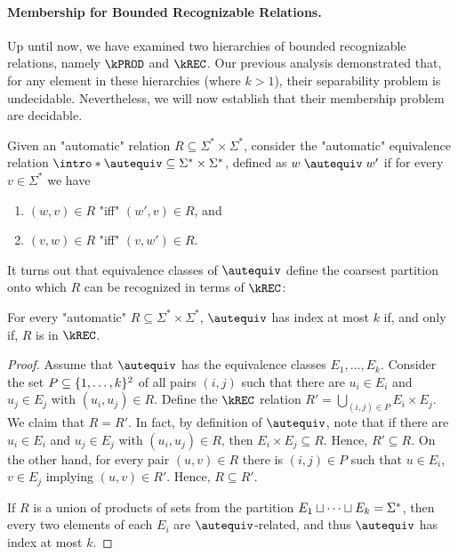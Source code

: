 \paragraph*{Membership for Bounded Recognizable Relations.}
Up until now, we have examined two hierarchies of bounded recognizable relations, namely $\kPROD$ and $\kREC$. 
Our previous analysis demonstrated that, for any element in these hierarchies (where $k>1$), their separability problem is undecidable. Nevertheless, 
we will now establish that their membership problem are decidable.

\AP Given an "automatic" relation $R \subseteq \Sigma^* \times \Sigma^*$, consider the "automatic" equivalence relation $\intro*\autequiv \subseteq \Sigma^* \times \Sigma^*$, defined as $w \mathrel{\autequiv} w'$ if for every $v \in \Sigma^*$ we have 
\begin{enumerate}
    \item $(w,v) \in R$ "iff" $(w',v) \in R$, and
    \item $(v,w) \in R$ "iff" $(v,w') \in R$.
\end{enumerate}

It turns out that equivalence classes of $\autequiv$ define the coarsest partition onto which $R$ can be recognized in terms of $\kREC$:

\begin{lemma}\AP\label{lem:krec-characterization}
    For every "automatic" $R \subseteq \Sigma^* \times \Sigma^*$, $\autequiv$ has index at most $k$ if, and only if, $R$ is in $\kREC$.
\end{lemma}
\begin{proof}
    Assume that $\autequiv$ has the equivalence classes $E_1, \dotsc, E_k$. Consider the set $P \subseteq \{1, \dotsc, k\}^2$ of all pairs $(i,j)$ such that there are $u_i \in E_i$ and $u_j \in E_j$ with $(u_i,u_j) \in R$. Define the $\kREC$ relation $R' = \bigcup_{(i,j) \in P} E_i \times E_j$. We claim that $R=R'$. 
    In fact, by definition of $\autequiv$, note that if there are $u_i \in E_i$ and $u_j \in E_j$ with $(u_i,u_j) \in R$, then $E_i \times E_j \subseteq R$. Hence, $R' \subseteq R$.
    On the other hand, for every pair $(u,v) \in R$ there is $(i,j) \in P$ such that $u \in E_i$, $v \in E_j$ implying $(u,v) \in R'$.
    Hence, $R \subseteq R'$.

    If $R$ is a union of products of sets from the partition $E_1 \sqcup \dotsb \sqcup E_k = \Sigma^*$, then every two elements of each $E_i$ are $\autequiv$-related, and thus $\autequiv$ has index at most $k$.
\end{proof}

